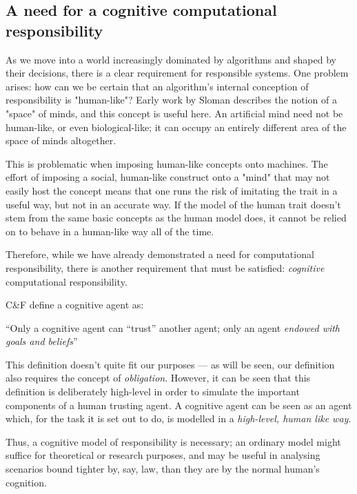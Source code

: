 \documentclass{mprop}
\begin{document}
\subsection{A need for a cognitive computational responsibility}

As we move into a world increasingly dominated by algorithms and shaped by their decisions, there is a clear requirement for responsible systems. One problem arises: how can we be certain that an algorithm's internal conception of responsibility is "human-like"? Early work by Sloman describes the notion of a "space" of minds\cite{Sloman1984TheMinds}, and this concept is useful here. An artificial mind need not be human-like, or even biological-like; it can occupy an entirely different area of the space of minds altogether. \par

This is problematic when imposing human-like concepts onto machines. The effort of imposing a social, human-like construct onto a "mind" that may not easily host the concept means that one runs the risk of imitating the trait in a useful way, but not in an accurate way. If the model of the human trait doesn't stem from the same basic concepts as the human model does, it cannot be relied on to behave in a human-like way all of the time. \par

Therefore, while we have already demonstrated a need for computational responsibility, there is another requirement that must be satisfied: \emph{cognitive} computational responsibility. \par

C\&F define a cognitive agent as:
\begin{displayquote}
``Only a cognitive agent can ``trust'' another agent; only an agent \emph{endowed with goals and beliefs}''
\end{displayquote}\par

This definition doesn't quite fit our purposes --- as will be seen, our definition also requires the concept of \emph{obligation}. However, it can be seen that this definition is deliberately high-level in order to simulate the important components of a human trusting agent. A cognitive agent can be seen as an agent which, for the task it is set out to do, is modelled in a \emph{high-level, human like way}. \par

Thus, a cognitive model of responsibility is necessary; an ordinary model might suffice for theoretical or research purposes, and may be useful in analysing scenarios bound tighter by, say, law, than they are by the normal human's cognition.\par
\end{document}
